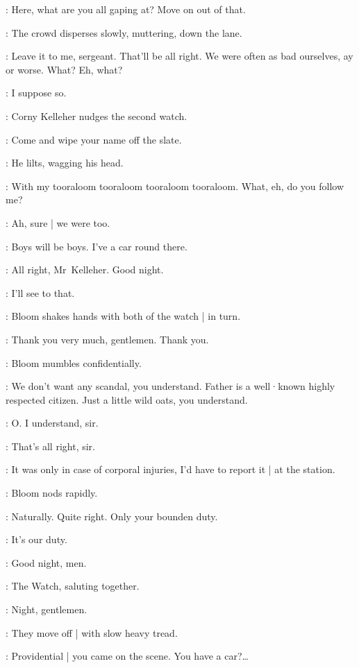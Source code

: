 \FirstWatch:
Here,
what are you all gaping at?
Move on out of that.

:
The crowd disperses slowly,
muttering,
down the lane.

\Corny:
Leave it to me,
sergeant.
That'll be all right.
We were often as bad ourselves,
ay or worse.
What?
Eh,
what?

\FirstWatch:
I suppose so.

:
Corny Kelleher nudges the second watch.

\Corny:
Come and wipe your name off the slate.

:
He lilts,
wagging his head.

\Corny:
With my tooraloom tooraloom tooraloom tooraloom.
What,
eh,
do you follow me?

\SecondWatch:
Ah,
sure |
we were too.

\Corny:
Boys will be boys.
I've a car round there.

\SecondWatch:
All right,
Mr~Kelleher.
Good night.

\Corny:
I'll see to that.

:
Bloom shakes hands with both of the watch |
in turn.

\Bloom:
Thank you very much,
gentlemen.
Thank you.

:
Bloom mumbles confidentially.

\Bloom:
We don't want any scandal,
you understand.
%
Father is a well·known highly respected citizen.
Just a little wild oats,
you understand.

\FirstWatch:
O\@.
I understand,
sir.

\SecondWatch:
That's all right,
sir.

\FirstWatch:
It was only in case of corporal injuries,
I'd have to report it |
at the station.

:
Bloom nods rapidly.

\Bloom:
Naturally.
Quite right.
Only your bounden duty.

\SecondWatch:
It's our duty.

\Corny:
Good night,
men.

:
The Watch,
saluting together.

\Watch:
Night,
gentlemen.

:
They move off |
with slow heavy tread.

\Bloom:
Providential |
you came on the scene.
You have a car?…

